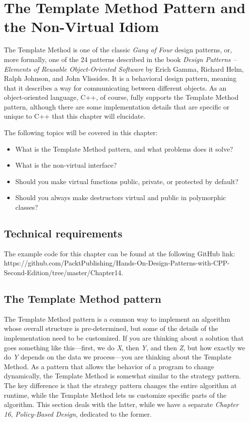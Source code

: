 ﻿\chapter{The Template Method Pattern and the Non-Virtual Idiom}

The Template Method is one of the classic \emph{Gang of Four} design patterns, or, more formally, one of the 24 patterns described in the book \emph{Design Patterns -- Elements of Reusable Object-Oriented Software} by Erich Gamma, Richard Helm, Ralph Johnson, and John Vlissides. It is a behavioral design pattern, meaning that it describes a way for communicating between different objects. As an object-oriented language, C++, of course, fully supports the Template Method pattern, although there are some implementation details that are specific or unique to C++ that this chapter will elucidate.

The following topics will be covered in this chapter:

\begin{itemize}
\item
  What is the Template Method pattern, and what problems does it solve?
\item
  What is the non-virtual interface?
\item
  Should you make virtual functions public, private, or protected by default?
\item
  Should you always make destructors virtual and public in polymorphic classes?
\end{itemize}

\section{Technical requirements}

The example code for this chapter can be found at the following GitHub link: https://github.com/PacktPublishing/Hands-On-Design-Patterns-with-CPP-Second-Edition/tree/master/Chapter14.

\section{The Template Method pattern}

The Template Method pattern is a common way to implement an algorithm whose overall structure is pre-determined, but some of the details of the implementation need to be customized. If you are thinking about a solution that goes something like this---first, we do \emph{X}, then \emph{Y}, and then \emph{Z}, but how exactly we do \emph{Y} depends on the data we process---you are thinking about the Template Method. As a pattern that allows the behavior of a program to change dynamically, the Template Method is somewhat similar to the strategy pattern. The key difference is that the strategy pattern changes the entire algorithm at runtime, while the Template Method lets us customize specific parts of the algorithm. This section deals with the latter, while we have a separate \emph{Chapter 16, Policy-Based Design}, dedicated to the former.

